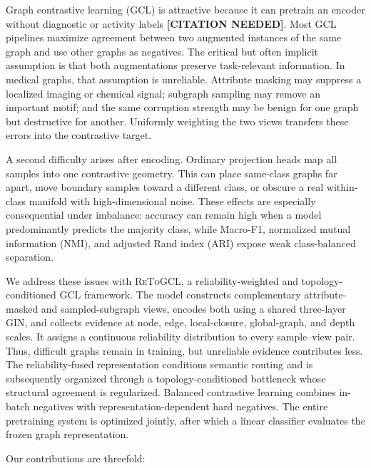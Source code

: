 \documentclass[10pt,twocolumn]{article}
\newcommand{\method}{\textsc{ReToGCL}}
\newcommand{\citeneeded}{\textbf{[CITATION NEEDED]}}
\begin{document}
Graph contrastive learning (GCL) is attractive because it can pretrain an encoder without diagnostic or activity labels \citeneeded. Most GCL pipelines maximize agreement between two augmented instances of the same graph and use other graphs as negatives. The critical but often implicit assumption is that both augmentations preserve task-relevant information. In medical graphs, that assumption is unreliable. Attribute masking may suppress a localized imaging or chemical signal; subgraph sampling may remove an important motif; and the same corruption strength may be benign for one graph but destructive for another. Uniformly weighting the two views transfers these errors into the contrastive target.

A second difficulty arises after encoding. Ordinary projection heads map all samples into one contrastive geometry. This can place same-class graphs far apart, move boundary samples toward a different class, or obscure a real within-class manifold with high-dimensional noise. These effects are especially consequential under imbalance: accuracy can remain high when a model predominantly predicts the majority class, while Macro-F1, normalized mutual information (NMI), and adjusted Rand index (ARI) expose weak class-balanced separation.

We address these issues with \method{}, a reliability-weighted and topology-conditioned GCL framework. The model constructs complementary attribute-masked and sampled-subgraph views, encodes both using a shared three-layer GIN, and collects evidence at node, edge, local-closure, global-graph, and depth scales. It assigns a continuous reliability distribution to every sample--view pair. Thus, difficult graphs remain in training, but unreliable evidence contributes less. The reliability-fused representation conditions semantic routing and is subsequently organized through a topology-conditioned bottleneck whose structural agreement is regularized. Balanced contrastive learning combines in-batch negatives with representation-dependent hard negatives. The entire pretraining system is optimized jointly, after which a linear classifier evaluates the frozen graph representation.

Our contributions are threefold:
\end{document}
